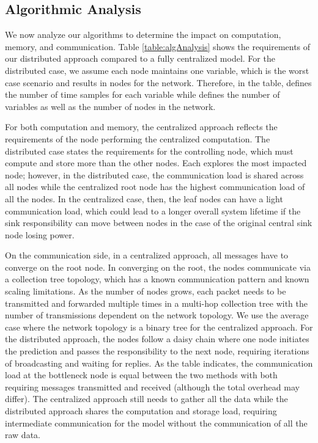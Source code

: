 \documentclass[prodmode,acmtosn]{acmsmall}
\begin{document}
\subsection{Algorithmic Analysis}
We now analyze our algorithms to determine the impact on computation, memory, and communication.
Table \ref{table:algAnalysis} shows the requirements of our distributed approach compared to a fully centralized model.
For the distributed case, we assume each node maintains one variable, which is the worst case scenario and results in  nodes for the network. 
Therefore, in the table,  defines the number of time samples for each variable while  defines the number of variables as well as the number of nodes in the network.

For both computation and memory, the centralized approach reflects the requirements of the node performing the centralized computation.
The distributed case states the requirements for the controlling node, which must compute and store more than the other nodes.
Each explores the most impacted node; however, in the distributed case, the communication load is shared across all nodes while the centralized root node has the highest communication load of all the nodes.
In the centralized case, then, the leaf nodes can have a light communication load, which could lead to a longer overall system lifetime if the sink responsibility can move between nodes in the case of the original central sink node losing power.

On the communication side, in a centralized approach, all messages have to converge on the root node.
In converging on the root, the nodes communicate via a collection tree topology, which has a known communication pattern and known scaling limitations.
As the number of nodes grows, each packet needs to be transmitted and forwarded multiple times in a multi-hop collection tree with the number of transmissions dependent on the network topology.
We use the average case where the network topology is a binary tree for the centralized approach.
For the distributed approach, the nodes follow a daisy chain where one node initiates the prediction and passes the responsibility to the next node, requiring  iterations of broadcasting and waiting for replies.
As the table indicates, the communication load at the bottleneck node is equal between the two methods with both requiring  messages transmitted and received (although the total overhead may differ).
The centralized approach still needs to gather all the data while the distributed approach shares the computation and storage load, requiring intermediate communication for the model without the communication of all the raw data.
\end{document}
